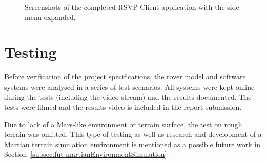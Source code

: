     \begin{figure}[H]
      \centering
      \caption[Screenshots of the completed RSVP Client application with the side menu expanded.]{Screenshots of the completed RSVP Client application with the side menu expanded.}
      \label{fig:postDev-clientMenu}
    \end{figure}

  \section{Testing}
    Before verification of the project specifications, the rover model and software systems were analysed in a series of test scenarios. All systems were kept online during the tests (including the video stream) and the results documented. The tests were filmed and the results video is included in the report submission.
    
    Due to lack of a Mars-like environment or terrain surface, the test on rough terrain was omitted. This type of testing as well as research and development of a Martian terrain simulation environment is mentioned as a possible future work in Section~\ref{subsec:fut-martianEnvironmentSimulation}.
    
